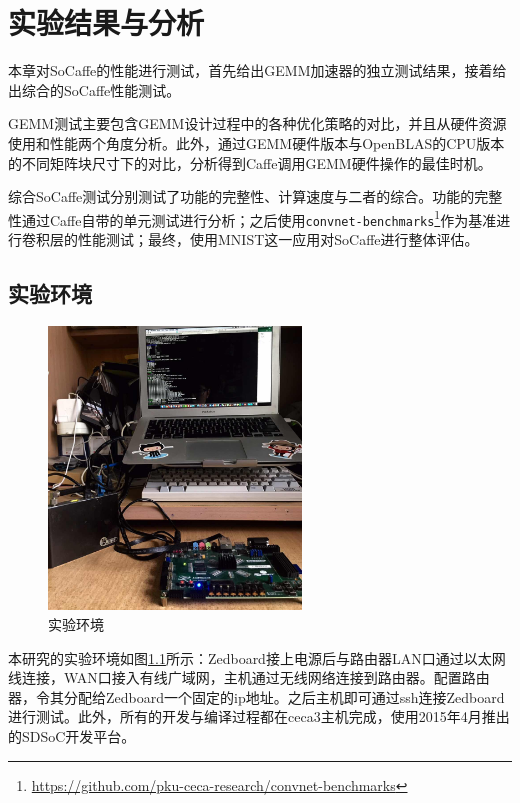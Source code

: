 \chapter{实验结果与分析}

本章对SoCaffe的性能进行测试，首先给出GEMM加速器的独立测试结果，接着给出综合的SoCaffe性能测试。

GEMM测试主要包含GEMM设计过程中的各种优化策略的对比，并且从硬件资源使用和性能两个角度分析。此外，通过GEMM硬件版本与OpenBLAS的CPU版本的不同矩阵块尺寸下的对比，分析得到Caffe调用GEMM硬件操作的最佳时机。

综合SoCaffe测试分别测试了功能的完整性、计算速度与二者的综合。功能的完整性通过Caffe自带的单元测试进行分析；之后使用\texttt{convnet-benchmarks}\footnote{\url{https://github.com/pku-ceca-research/convnet-benchmarks}}作为基准进行卷积层的性能测试；最终，使用MNIST这一应用对SoCaffe进行整体评估。

\section{实验环境}

\begin{figure}[!ht]
	\centering	
	\includegraphics[width=0.6\textwidth]{assets/imgs/env.jpg}
	\caption{实验环境}
	\label{fig:env}
\end{figure}

本研究的实验环境如图\ref{fig:env}所示：Zedboard接上电源后与路由器LAN口通过以太网线连接，WAN口接入有线广域网，主机通过无线网络连接到路由器。配置路由器，令其分配给Zedboard一个固定的ip地址。之后主机即可通过ssh连接Zedboard进行测试。此外，所有的开发与编译过程都在ceca3主机完成，使用2015年4月推出的SDSoC开发平台。

